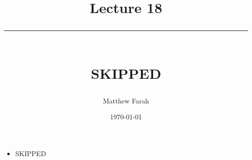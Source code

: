 \documentclass{article}
\date{
	\vspace{-.75em}
	{\large \today}
}
\title{
	\vspace*{-1.5em}
	{\Huge Lecture 18} \\
	\vspace{-1em}
	\rule{\textwidth/4}{.01em} \\
	\vspace{-.25em}
	{\Large SKIPPED}
	\vspace{-.75em}
}
\author{
	{\large Matthew Farah}
}
\begin{document}
\maketitle
\pagestyle{fancy}

\fi

\begin{itemize}
	\item SKIPPED
\end{itemize}

\ifdefined\iscombined
	\newpage
\else
	
\end{document}
